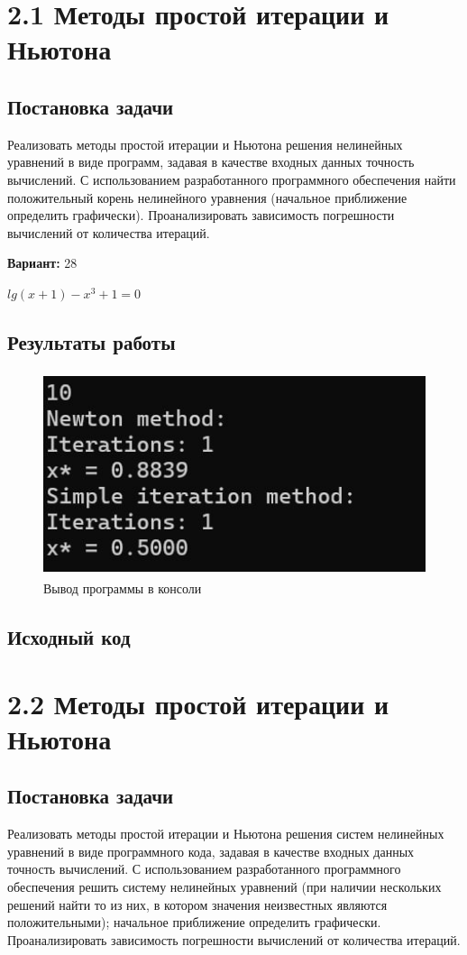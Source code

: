 \section* {2.1  Методы простой итерации и Ньютона}

\subsection{Постановка задачи}
Реализовать методы простой итерации и Ньютона решения нелинейных уравнений в виде программ, задавая в качестве входных данных точность вычислений. С использованием разработанного программного обеспечения найти положительный корень нелинейного уравнения (начальное приближение определить графически). Проанализировать зависимость погрешности вычислений от количества итераций.

{\bfseries Вариант:} 28

$lg(x+1)-x^3+1=0$

\subsection{Результаты работы}
\begin{figure}[h!]
\centering
\includegraphics[width=12cm, height=6cm]{img/img1.jpg}
\caption{Вывод программы в консоли}
\end{figure}
\pagebreak

\subsection{Исходный код}



\section* {2.2  Методы простой итерации и Ньютона}

\subsection{Постановка задачи}
Реализовать методы простой итерации и Ньютона решения систем нелинейных уравнений в виде программного кода, задавая в качестве входных данных точность вычислений. С использованием разработанного программного обеспечения решить систему нелинейных уравнений (при наличии нескольких решений найти то из них, в котором значения неизвестных являются положительными); начальное приближение определить графически. Проанализировать зависимость погрешности вычислений от количества итераций. 

